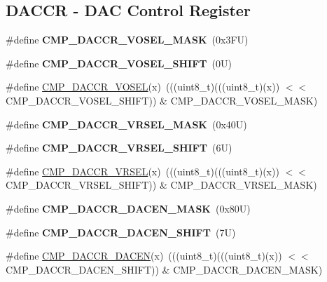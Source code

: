 \subsection*{D\+A\+C\+CR -\/ D\+AC Control Register}
\begin{DoxyCompactItemize}
\item 
\mbox{\label{group___c_m_p___register___masks_gaf785bdf33cec5e0e8d03022bd7d92022}} 
\#define {\bfseries C\+M\+P\+\_\+\+D\+A\+C\+C\+R\+\_\+\+V\+O\+S\+E\+L\+\_\+\+M\+A\+SK}~(0x3\+F\+U)
\item 
\mbox{\label{group___c_m_p___register___masks_ga329adee42ffc5125d3a6a85c6b990311}} 
\#define {\bfseries C\+M\+P\+\_\+\+D\+A\+C\+C\+R\+\_\+\+V\+O\+S\+E\+L\+\_\+\+S\+H\+I\+FT}~(0\+U)
\item 
\#define \mbox{\hyperlink{group___c_m_p___register___masks_gaac950bb0c2d158445dd28d3493708637}{C\+M\+P\+\_\+\+D\+A\+C\+C\+R\+\_\+\+V\+O\+S\+EL}}(x)~(((uint8\+\_\+t)(((uint8\+\_\+t)(x)) $<$$<$ C\+M\+P\+\_\+\+D\+A\+C\+C\+R\+\_\+\+V\+O\+S\+E\+L\+\_\+\+S\+H\+I\+FT)) \& C\+M\+P\+\_\+\+D\+A\+C\+C\+R\+\_\+\+V\+O\+S\+E\+L\+\_\+\+M\+A\+SK)
\item 
\mbox{\label{group___c_m_p___register___masks_gac9eceaf5b3e478eb1a332681c8bcf160}} 
\#define {\bfseries C\+M\+P\+\_\+\+D\+A\+C\+C\+R\+\_\+\+V\+R\+S\+E\+L\+\_\+\+M\+A\+SK}~(0x40\+U)
\item 
\mbox{\label{group___c_m_p___register___masks_gab9f804a9c4ecafbaaa82f2fc0ec69083}} 
\#define {\bfseries C\+M\+P\+\_\+\+D\+A\+C\+C\+R\+\_\+\+V\+R\+S\+E\+L\+\_\+\+S\+H\+I\+FT}~(6\+U)
\item 
\#define \mbox{\hyperlink{group___c_m_p___register___masks_ga27c3cbdda69ab132f0a4ac2408221e37}{C\+M\+P\+\_\+\+D\+A\+C\+C\+R\+\_\+\+V\+R\+S\+EL}}(x)~(((uint8\+\_\+t)(((uint8\+\_\+t)(x)) $<$$<$ C\+M\+P\+\_\+\+D\+A\+C\+C\+R\+\_\+\+V\+R\+S\+E\+L\+\_\+\+S\+H\+I\+FT)) \& C\+M\+P\+\_\+\+D\+A\+C\+C\+R\+\_\+\+V\+R\+S\+E\+L\+\_\+\+M\+A\+SK)
\item 
\mbox{\label{group___c_m_p___register___masks_gacfd8aec2de81865d8f5fc0f06d17ba08}} 
\#define {\bfseries C\+M\+P\+\_\+\+D\+A\+C\+C\+R\+\_\+\+D\+A\+C\+E\+N\+\_\+\+M\+A\+SK}~(0x80\+U)
\item 
\mbox{\label{group___c_m_p___register___masks_ga85aa1686a0d5a7de2375bfab7167bb93}} 
\#define {\bfseries C\+M\+P\+\_\+\+D\+A\+C\+C\+R\+\_\+\+D\+A\+C\+E\+N\+\_\+\+S\+H\+I\+FT}~(7\+U)
\item 
\#define \mbox{\hyperlink{group___c_m_p___register___masks_ga4d4b6f6bdeaeed839b8f565113dd2717}{C\+M\+P\+\_\+\+D\+A\+C\+C\+R\+\_\+\+D\+A\+C\+EN}}(x)~(((uint8\+\_\+t)(((uint8\+\_\+t)(x)) $<$$<$ C\+M\+P\+\_\+\+D\+A\+C\+C\+R\+\_\+\+D\+A\+C\+E\+N\+\_\+\+S\+H\+I\+FT)) \& C\+M\+P\+\_\+\+D\+A\+C\+C\+R\+\_\+\+D\+A\+C\+E\+N\+\_\+\+M\+A\+SK)
\end{DoxyCompactItemize}
